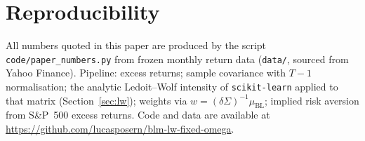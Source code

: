 \documentclass[a4paper,11pt]{article}
\theoremstyle{plain}
\theoremstyle{definition}
\begin{document}
\section*{Reproducibility}

All numbers quoted in this paper are produced by the script
\texttt{code/paper\_numbers.py} from frozen monthly return data
(\texttt{data/}, sourced from Yahoo Finance). Pipeline: excess returns;
sample covariance with $T-1$ normalisation; the analytic Ledoit--Wolf
intensity of \texttt{scikit-learn} applied to that matrix
(Section~\ref{sec:lw}); weights via
$w = (\delta\Sigma)^{-1}\mu_{\mathrm{BL}}$; implied risk aversion from
S\&P~500 excess returns. Code and data are available at
\url{https://github.com/lucasposern/blm-lw-fixed-omega}.
\end{document}
